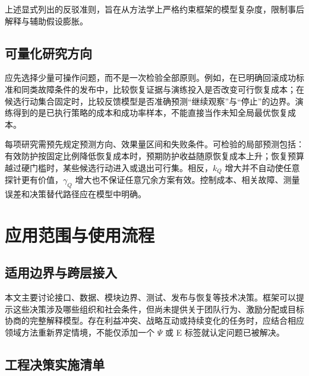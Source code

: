 \documentclass[11pt,a4paper]{ctexart}
\numberwithin{equation}{section}
\theoremstyle{definition}
\theoremstyle{plain}
\begin{document}
上述显式列出的反驳准则，旨在从方法学上严格约束框架的模型复杂度，限制事后解释与辅助假设膨胀。

\subsection{可量化研究方向}

应先选择少量可操作问题，而不是一次检验全部原则。例如，在已明确回滚成功标准和同类故障条件的发布中，比较恢复证据与演练投入是否改变可行恢复成本；在候选行动集合固定时，比较反馈模型是否准确预测“继续观察”与“停止”的边界。演练得到的是已执行策略的成本和成功率样本，不能直接当作未知全局最优恢复成本。

每项研究需预先规定预测方向、效果量区间和失败条件。可检验的局部预测包括：有效防护按固定比例降低恢复成本时，预期防护收益随原恢复成本上升；恢复预算越过硬门槛时，某些候选行动进入或退出可行集。相反，$k_Q$ 增大并不自动使任意探针更有价值，$\gamma_Q$ 增大也不保证任意冗余方案有效。控制成本、相关故障、测量误差和决策替代路径应在模型中明确。

\section{应用范围与使用流程}

\subsection{适用边界与跨层接入}

本文主要讨论接口、数据、模块边界、测试、发布与恢复等技术决策。框架可以提示这些决策涉及哪些组织和社会条件，但尚未提供关于团队行为、激励分配或目标协商的完整解释模型。存在利益冲突、战略互动或持续变化的任务时，应结合相应领域方法重新界定情境，不能仅添加一个 $\Psi$ 或 E 标签就认定问题已被解决。

\subsection{工程决策实施清单}
\end{document}
